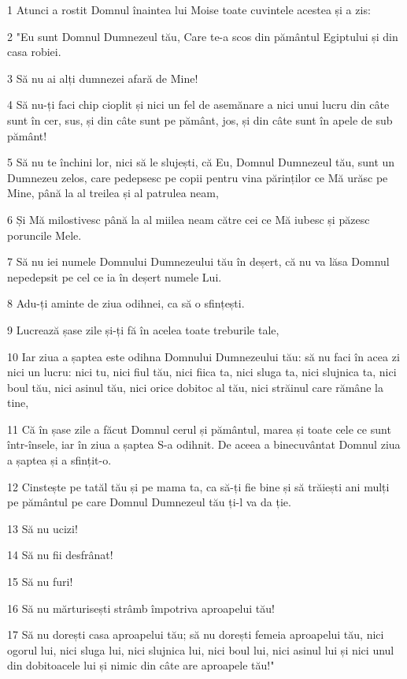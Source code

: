 \par 1 Atunci a rostit Domnul înaintea lui Moise toate cuvintele acestea și a zis:
\par 2 "Eu sunt Domnul Dumnezeul tău, Care te-a scos din pământul Egiptului și din casa robiei.
\par 3 Să nu ai alți dumnezei afară de Mine!
\par 4 Să nu-ți faci chip cioplit și nici un fel de asemănare a nici unui lucru din câte sunt în cer, sus, și din câte sunt pe pământ, jos, și din câte sunt în apele de sub pământ!
\par 5 Să nu te închini lor, nici să le slujești, că Eu, Domnul Dumnezeul tău, sunt un Dumnezeu zelos, care pedepsesc pe copii pentru vina părinților ce Mă urăsc pe Mine, până la al treilea și al patrulea neam,
\par 6 Și Mă milostivesc până la al miilea neam către cei ce Mă iubesc și păzesc poruncile Mele.
\par 7 Să nu iei numele Domnului Dumnezeului tău în deșert, că nu va lăsa Domnul nepedepsit pe cel ce ia în deșert numele Lui.
\par 8 Adu-ți aminte de ziua odihnei, ca să o sfințești.
\par 9 Lucrează șase zile și-ți fă în acelea toate treburile tale,
\par 10 Iar ziua a șaptea este odihna Domnului Dumnezeului tău: să nu faci în acea zi nici un lucru: nici tu, nici fiul tău, nici fiica ta, nici sluga ta, nici slujnica ta, nici boul tău, nici asinul tău, nici orice dobitoc al tău, nici străinul care rămâne la tine,
\par 11 Că în șase zile a făcut Domnul cerul și pământul, marea și toate cele ce sunt într-însele, iar în ziua a șaptea S-a odihnit. De aceea a binecuvântat Domnul ziua a șaptea și a sfințit-o.
\par 12 Cinstește pe tatăl tău și pe mama ta, ca să-ți fie bine și să trăiești ani mulți pe pământul pe care Domnul Dumnezeul tău ți-l va da ție.
\par 13 Să nu ucizi!
\par 14 Să nu fii desfrânat!
\par 15 Să nu furi!
\par 16 Să nu mărturisești strâmb împotriva aproapelui tău!
\par 17 Să nu dorești casa aproapelui tău; să nu dorești femeia aproapelui tău, nici ogorul lui, nici sluga lui, nici slujnica lui, nici boul lui, nici asinul lui și nici unul din dobitoacele lui și nimic din câte are aproapele tău!"
